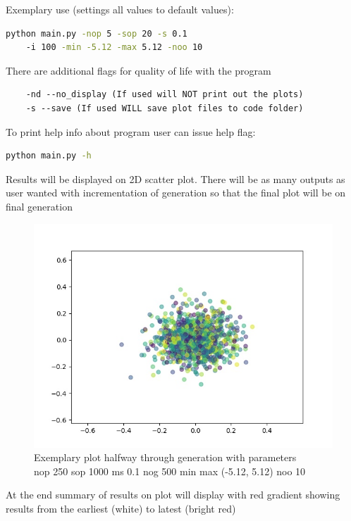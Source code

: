\documentclass{article}[12pt]
\begin{document}
Exemplary use (settings all values to default values):
\begin{lstlisting}[language=bash]
    python main.py -nop 5 -sop 20 -s 0.1
    -i 100 -min -5.12 -max 5.12 -noo 10
\end{lstlisting}
There are additional flags for quality of life with the program
\begin{lstlisting}
    -nd --no_display (If used will NOT print out the plots)
    -s --save (If used WILL save plot files to code folder)
\end{lstlisting}
To print help info about program user can issue help flag:
\begin{lstlisting}[language=bash]
    python main.py -h
\end{lstlisting}
Results will be displayed on 2D scatter plot. There will be as many outputs as user wanted with incrementation of generation so that the final plot will be on final generation \\ 
\begin{figure}[H]
    \caption{Exemplary plot halfway through generation with parameters \\ nop 250 sop 1000 ms 0.1 nog 500 min max (-5.12, 5.12) noo 10 }
    \includegraphics[width=\textwidth]{example_halfway.jpg}
    \centering
    \end{figure}
At the end summary of results on plot will display with red gradient showing results from the earliest (white) to latest (bright red) \\  
\end{document}

